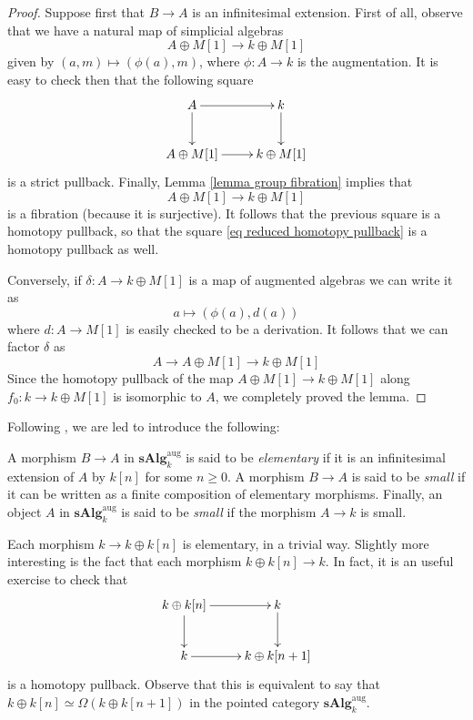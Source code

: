 \begin{refsection}
\begin{proof}
Suppose first that $B \to A$ is an infinitesimal extension. First of all, observe that we have a natural map of simplicial algebras
\[
A \oplus M[1] \to k \oplus M[1]
\]
given by $(a,m) \mapsto (\phi(a),m)$, where $\phi \colon A \to k$ is the augmentation. It is easy to check then that the following square
\[
\xymatrix{
A \ar[d] \ar[r] & k \ar[d] \\ A \oplus M[1] \ar[r] & k \oplus M[1]
}
\]
is a strict pullback. Finally, Lemma \ref{lemma group fibration} implies that
\[
A \oplus M[1] \to k \oplus M[1]
\]
is a fibration (because it is surjective). It follows that the previous square is a homotopy pullback, so that the square \eqref{eq reduced homotopy pullback} is a homotopy pullback as well.

Conversely, if $\delta \colon A \to k \oplus M[1]$ is a map of augmented algebras we can write it as
\[
a \mapsto (\phi(a), d(a))
\]
where $d \colon A \to M[1]$ is easily checked to be a derivation. It follows that we can factor $\delta$ as
\[
A \to A \oplus M[1] \to k \oplus M[1]
\]
Since the homotopy pullback of the map $A \oplus M[1] \to k \oplus M[1]$ along $f_0 \colon k \to k \oplus M[1]$ is isomorphic to $A$, we completely proved the lemma.
\end{proof}

Following \cite[Definition 1.1.5]{dagx}, we are led to introduce the following:

\begin{defin}
A morphism $B \to A$ in $\mathbf{sAlg}_k^{\mathrm{aug}}$ is said to be \emph{elementary} if it is an infinitesimal extension of $A$ by $k[n]$ for some $n \ge 0$. A morphism $B \to A$ is said to be \emph{small} if it can be written as a finite composition of elementary morphisms. Finally, an object $A$ in $\mathbf{sAlg}_k^{\mathrm{aug}}$ is said to be \emph{small} if the morphism $A \to k$ is small.
\end{defin}

\begin{eg} \label{eg elementary morphisms}
Each morphism $k \to k \oplus k[n]$ is elementary, in a trivial way. Slightly more interesting is the fact that each morphism $k \oplus k[n] \to k$. In fact, it is an useful exercise to check that
\[
\xymatrix{
k \oplus k[n] \ar[r] \ar[d] & k \ar[d] \\ k \ar[r] & k \oplus k[n+1]
}
\]
is a homotopy pullback. Observe that this is equivalent to say that $k \oplus k[n] \simeq \Omega( k \oplus k[n+1])$ in the pointed category $\mathbf{sAlg}_k^{\mathrm{aug}}$.
\end{eg}


\end{refsection}
